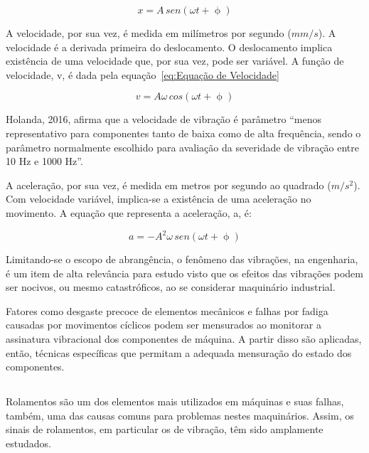 \documentclass[
	12pt,				
	oneside,			
	a4paper,			
	english,			
	brazil,			
	]{abntex2ppgsi}
\begin{document}
\begin{equation}
	x = A \,sen (\omega t + \upphi)
	\label{eq:Equação de deslocamento}
\end{equation}

A velocidade, por sua vez, é medida em milímetros por segundo ($mm/s$). A velocidade é a derivada primeira do deslocamento. O deslocamento implica existência de uma velocidade que, por sua vez, pode ser variável. A função de velocidade, v, é dada pela equação~\ref{eq:Equação de Velocidade}

\begin{equation}
	v = A\omega \,cos (\omega t + \upphi)
	\label{eq:Equação de Velocidade}
\end{equation}

Holanda, 2016, afirma que a velocidade de vibração é parâmetro “menos representativo para componentes tanto de baixa como de alta frequência, sendo o parâmetro normalmente escolhido para avaliação da severidade de vibração entre 10 Hz e 1000 Hz”.

A aceleração, por sua vez, é medida em metros por segundo ao quadrado ($m/s^{2}$). Com velocidade variável, implica-se a existência de uma aceleração no movimento. A equação que representa a aceleração, a, é:

\begin{equation}
	a = -A^{2} \omega \,sen (\omega t + \upphi)
	\label{eq: Equação de Aceleração}
\end{equation}

Limitando-se o escopo de abrangência, o fenômeno das vibrações, na engenharia, é um item de alta relevância para estudo visto que os efeitos das vibrações podem ser nocivos, ou mesmo catastróficos, ao se considerar maquinário industrial. 

Fatores como desgaste precoce de elementos mecânicos e falhas por fadiga causadas por movimentos cíclicos podem ser mensurados ao monitorar a assinatura vibracional dos componentes de máquina. A partir disso são aplicadas, então, técnicas específicas que permitam a adequada mensuração do estado dos componentes. 

\subsection{}
\label{secao:frequenciasCaracteristicas}

Rolamentos são um dos elementos mais utilizados em máquinas e suas falhas, também, uma das causas comuns para problemas nestes maquinários. Assim, os sinais de rolamentos, em particular os de vibração, têm sido amplamente estudados. 
\end{document}

